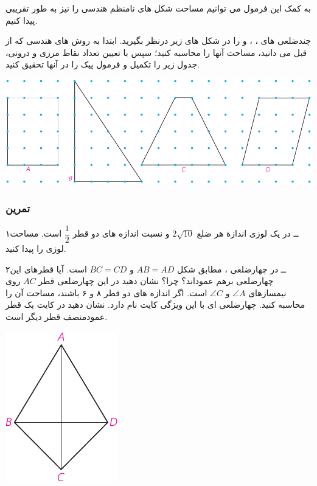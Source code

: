 \documentclass[12pt, a4paper]{book}
\begin{document}
به کمک این فرمول می توانیم مساحت شکل های نامنظم هندسی را نیز به طور تقریبی پیدا کنیم.

\newpage

چندضلعی های 
 ،
 ،
 و
را در شکل های زیر درنظر بگیرید. ابتدا به روش های هندسی که از قبل می دانید، مساحت آنها را محاسبه کنید؛ سپس با تعیین تعداد نقاط مرزی و درونی، جدول زیر را تکمیل و فرمول پیک را در آنها تحقیق کنید.
\smallskip

\begin{minipage}{1\textwidth}
	\begin{center}
		\includegraphics{"Shapes/Fasl - 3/Dars 2/P71-S1.pdf"}
	\end{center}
\end{minipage}

\subsubsection{تمرین}

۱ــ در یک لوزی اندازهٔ هر ضلع 
$2\sqrt{10}$
و نسبت اندازه های دو قطر
$\dfrac12$
است. مساحت لوزی را پیدا کنید.

\bigskip

۲ــ در چهارضلعی
،
مطابق شکل 
$AB = AD$
و
$BC = CD$
است. آیا قطرهای این چهارضلعی برهم عموداند؟ چرا؟ نشان دهید در این چهارضلعی قطر 
$AC$
روی نیمسازهای
$\angle A$
و
$\angle C$
است. اگر اندازه های دو قطر ۸ و ۶ باشند، مساحت آن را محاسبه کنید. چهارضلعی ای با این ویژگی کایت نام دارد. نشان دهید در کایت یک قطر عمودمنصف قطر دیگر است.

\begin{minipage}{1\textwidth}
	\begin{flushleft}
		\includegraphics{"Shapes/Fasl - 3/Dars 2/P72-S1.pdf"}
	\end{flushleft}
\end{minipage}
\end{document}
